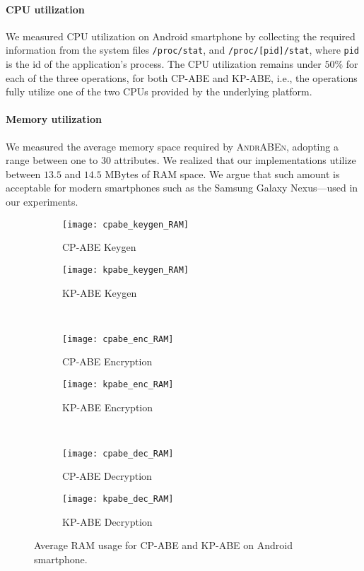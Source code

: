 \documentclass{sig-alternate-2013}
\newcommand{\andraben}{\textsc{AndrABEn}}
\begin{document}
\paragraph{CPU utilization} We measured CPU utilization on Android smartphone by collecting the required information from the system files {\tt /proc/stat}, and {\tt /proc/[pid]/stat}, where {\tt pid} is the id of the application's process. The CPU utilization remains under $50\%$ for each of the three operations, for both CP-ABE and KP-ABE, i.e., the operations fully utilize one of the two CPUs provided by the underlying platform.

\paragraph{Memory utilization} We measured the average memory space required by \andraben, adopting a range between one to 30 attributes. We realized that our implementations utilize between $13.5$ and $14.5$ MBytes of RAM space. We argue that such amount is acceptable for modern smartphones such as the Samsung Galaxy Nexus---used in our experiments. 

\begin{figure}[h!]
	\centering
	\begin{subfigure}[b]{0.49\columnwidth}
		\centering
		\texttt{[image: cpabe\_keygen\_RAM]}
		\caption{CP-ABE Keygen}
		\label{cpabe_keygen_RAM}
	\end{subfigure}
	\begin{subfigure}[b]{0.49\columnwidth}
		\centering
		\texttt{[image: kpabe\_keygen\_RAM]}
		\caption{KP-ABE Keygen}
		\label{kpabe_keygen_RAM}
	\end{subfigure}
	\\
	\begin{subfigure}[b]{0.49\columnwidth}
		\centering
		\texttt{[image: cpabe\_enc\_RAM]}
		\caption{CP-ABE Encryption}
		\label{cpabe_enc_RAM}
	\end{subfigure}
	\begin{subfigure}[b]{0.49\columnwidth}
		\centering
		\texttt{[image: kpabe\_enc\_RAM]}
		\caption{KP-ABE Encryption}
		\label{kpabe_enc_RAM}
	\end{subfigure}
	\\
	\begin{subfigure}[b]{0.49\columnwidth}
		\centering
		\texttt{[image: cpabe\_dec\_RAM]}
		\caption{CP-ABE Decryption}
		\label{cpabe_dec_RAM}
	\end{subfigure}
	\begin{subfigure}[b]{0.49\columnwidth}
		\centering
		\texttt{[image: kpabe\_dec\_RAM]}
		\caption{KP-ABE Decryption}
		\label{kpabe_dec_RAM}
	\end{subfigure}
	\caption{Average RAM usage for CP-ABE and KP-ABE on Android smartphone.}
	\label{fig:android_RAM}
\end{figure}
\end{document}

